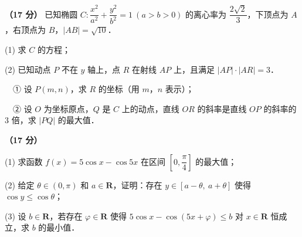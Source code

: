 \begin{question}
\textbf{（17 分）} 已知椭圆 $C:\dfrac{x^2}{a^2}+\dfrac{y^2}{b^2}=1\ (a>b>0)$ 的离心率为 $\dfrac{2\sqrt2}{3}$，下顶点为 $A$，右顶点为 $B$，$|AB|=\sqrt{10}$．

  (1) 求 $C$ 的方程；

  (2) 已知动点 $P$ 不在 $y$ 轴上，点 $R$ 在射线 $AP$ 上，且满足 $|AP|\cdot|AR|=3$．

  　① 设 $P(m,n)$，求 $R$ 的坐标（用 $m$，$n$ 表示）；

  　② 设 $O$ 为坐标原点，$Q$ 是 $C$ 上的动点，直线 $OR$ 的斜率是直线 $OP$ 的斜率的 $3$ 倍，求 $|PQ|$ 的最大值．

\end{question}
\begin{question}
\textbf{（17 分）} 

  (1) 求函数 $f(x)=5\cos x-\cos 5x$ 在区间 $\left[0,\dfrac{\pi}{4}\right]$ 的最大值；

  (2) 给定 $\theta\in(0,\pi)$ 和 $a\in\mathbf{R}$，证明：存在 $y\in[a-\theta,\ a+\theta]$ 使得 $\cos y\le\cos\theta$；

  (3) 设 $b\in\mathbf{R}$，若存在 $\varphi\in\mathbf{R}$ 使得 $5\cos x-\cos(5x+\varphi)\le b$ 对 $x\in\mathbf{R}$ 恒成立，求 $b$ 的最小值．

\par\medskip


\end{question}
